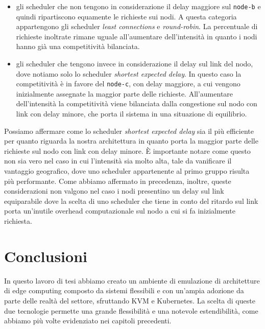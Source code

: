 \documentclass[12pt, hidelinks]{report}
\begin{document}
\begin{itemize}
    \item gli scheduler che non tengono in considerazione il delay maggiore sul \texttt{node-b} e quindi ripartiscono equamente le richieste sui nodi. A questa categoria appartengono gli scheduler \textit{least connections} e \textit{round-robin}. La percentuale di richieste inoltrate rimane uguale all'aumentare dell'intensità in quanto i nodi hanno già una competitività bilanciata.
    \item gli scheduler che tengono invece in considerazione il delay sul link del nodo, dove notiamo solo lo scheduler \textit{shortest expected delay}. In questo caso la competitività è in favore del \texttt{node-c}, con delay maggiore, a cui vengono inizialmente assegnate la maggior parte delle richieste. All'aumentare dell'intensità la competitività viene bilanciata dalla congestione sul nodo con link con delay minore, che porta il sistema in una situazione di equilibrio.
\end{itemize}

Possiamo affermare come lo scheduler \textit{shortest expected delay} sia il più efficiente per quanto riguarda la nostra architettura in quanto porta la maggior parte delle richieste sul nodo con link con delay minore. È importante notare come questo non sia vero nel caso in cui l'intensità sia molto alta, tale da vanificare il vantaggio geografico, dove uno scheduler appartenente al primo gruppo risulta più performante. Come abbiamo affermato in precedenza, inoltre, queste considerazioni non valgono nel caso i nodi presentino un delay sul link equiparabile dove la scelta di uno scheduler che tiene in conto del ritardo sul link porta un'inutile overhead computazionale sul nodo a cui si fa inizialmente richiesta. 

\chapter*{Conclusioni}

In questo lavoro di tesi abbiamo creato un ambiente di emulazione di architetture di edge computing composto da sistemi flessibili e con un'ampia adozione da parte delle realtà del settore, sfruttando KVM e Kubernetes. La scelta di queste due tecnologie permette una grande flessibilità e una notevole estendibilità, come abbiamo più volte evidenziato nei capitoli precedenti.
\end{document}
